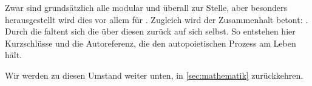 \begin{newstuff}
    Zwar sind grundsätzlich alle  modular und überall zur Stelle, aber besonders herausgestellt wird dies vor allem für . Zugleich wird der Zusammenhalt betont: .
    Durch die  faltent sich die  über diesen  zurück auf sich selbst. So entstehen hier Kurzschlüsse und die Autoreferenz, die den autopoietischen Prozess am Leben hält. 

 Wir werden zu diesen Umstand weiter unten, in \cref{sec:mathematik}   zurückkehren.
\end{newstuff}